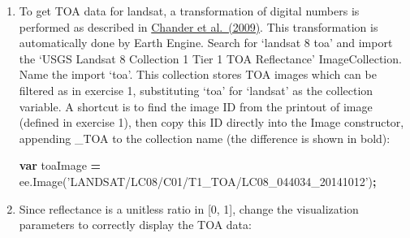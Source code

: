 \documentclass[
]{article}
\newenvironment{Shaded}{\begin{snugshade}}{\end{snugshade}}
\newcommand{\AttributeTok}[1]{\textcolor[rgb]{0.77,0.63,0.00}{#1}}
\newcommand{\KeywordTok}[1]{\textcolor[rgb]{0.13,0.29,0.53}{\textbf{#1}}}
\newcommand{\NormalTok}[1]{#1}
\newcommand{\OperatorTok}[1]{\textcolor[rgb]{0.81,0.36,0.00}{\textbf{#1}}}
\newcommand{\StringTok}[1]{\textcolor[rgb]{0.31,0.60,0.02}{#1}}
\newcommand{\VariableTok}[1]{\textcolor[rgb]{0.00,0.00,0.00}{#1}}
\begin{document}
\begin{enumerate}
\def\labelenumi{\alph{enumi}.}
\item
  To get TOA data for landsat, a transformation of digital numbers is performed as described in \href{http://www.sciencedirect.com/science/article/pii/S0034425709000169}{Chander et al.~(2009)}. This transformation is automatically done by Earth Engine. Search for `landsat 8 toa' and import the `USGS Landsat 8 Collection 1 Tier 1 TOA Reflectance' ImageCollection. Name the import `toa'. This collection stores TOA images which can be filtered as in exercise 1, substituting `toa' for `landsat' as the collection variable. A shortcut is to find the image ID from the printout of image (defined in exercise 1), then copy this ID directly into the Image constructor, appending \_TOA to the collection name (the difference is shown in bold):

\begin{Shaded}
\begin{Highlighting}[]
\KeywordTok{var}\NormalTok{ toaImage }\OperatorTok{=} \VariableTok{ee}\NormalTok{.}\AttributeTok{Image}\NormalTok{(}\StringTok{'LANDSAT/LC08/C01/T1_TOA/LC08_044034_20141012'}\NormalTok{)}\OperatorTok{;}  
\end{Highlighting}
\end{Shaded}
\item
  Since reflectance is a unitless ratio in {[}0, 1{]}, change the visualization parameters to correctly display the TOA data:


\end{enumerate}
\end{document}
